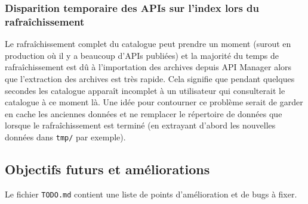 \subsubsection{Disparition temporaire des APIs sur l'index lors du rafraîchissement}
Le rafraîchissement complet du catalogue peut prendre un moment (surout en production où il y a beaucoup d'APIs publiées) et la majorité du temps de rafraîchissement est dû à l'importation des archives depuis API Manager alors que l'extraction des archives est très rapide. Cela signifie que pendant quelques secondes les catalogue apparaît incomplet à un utilisateur qui consulterait le catalogue à ce moment là. Une idée pour contourner ce problème serait de garder en cache les anciennes données et ne remplacer le répertoire de données que lorsque le rafraîchissement est terminé (en extrayant d'abord les nouvelles données dans \texttt{tmp/} par exemple).

\subsection{Objectifs futurs et améliorations}
Le fichier \texttt{TODO.md} contient une liste de points d'amélioration et de bugs à fixer.

